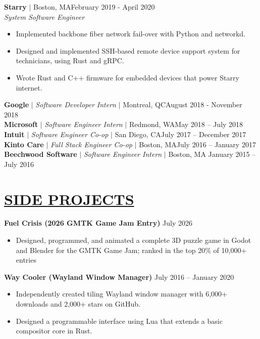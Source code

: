 \documentclass[overlapped,line]{res}
\begin{document}
\begin{resume}
\textbf{Starry} $|$ Boston, MA\hfill February 2019 - April 2020\\
{\sl System Software Engineer}
\begin{itemize} \itemsep -2pt
    \item Implemented backbone fiber network fail-over with Python and networkd.
    \item Designed and implemented SSH-based remote device support system for
	    technicians, using Rust and gRPC.
    \item Wrote Rust and C++ firmware for embedded devices that power Starry
	    internet.
\end{itemize}
\vspace{-.5em}
\textbf{Google} $|$ {\sl Software Developer Intern} $|$ Montreal, QC\hfill August 2018 - November 2018
\vspace{.5em}\\
\textbf{Microsoft} $|$ {\sl Software Engineer Intern} $|$ Redmond, WA\hfill May 2018 \--- July 2018
\vspace{.5em}\\
\textbf{Intuit} $|$ {\sl Software Engineer Co-op} $|$ San Diego, CA\hfill July 2017 \--- December 2017
\vspace{.5em}\\
\textbf{Kinto Care} $|$ {\sl Full Stack Engineer Co-op} $|$ Boston, MA\hfill July 2016 \--- January 2017
\vspace{.5em}\\
\textbf{Beechwood Software} $|$ {\sl Software Engineer Intern} $|$ Boston, MA \hfill January 2015 \--- July 2016
\noindent\makebox[7.15in]{\rule{7.15in}{0.4pt}}

\section{\underline{SIDE PROJECTS}}
\textbf{Fuel Crisis (2026 GMTK Game Jam Entry)} \hfill July 2026
\begin{itemize}  \itemsep -2pt
	\item Designed, programmed, and animated a complete 3D puzzle game in Godot and 
		Blender for the GMTK Game Jam; ranked in the top 20\% of 10,000+ entries
\end{itemize}
\vspace{-.7em}
\textbf{Way Cooler (Wayland Window Manager)} \hfill July 2016 \--- January 2020
\begin{itemize}  \itemsep -2pt
	\item Independently created tiling Wayland window manager with 6,000+
		downloads and 2,000+ stars on GitHub.
	\item Designed a programmable interface using Lua that extends
      a basic compositor core in Rust.
\end{itemize}


\end{resume}
\end{document}
